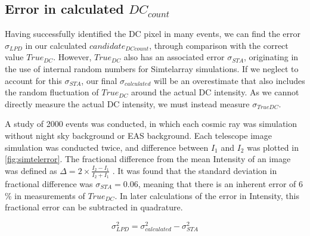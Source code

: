 \documentclass{article}
\begin{document}
\subsection{Error in calculated $DC_{count}$}
Having successfully identified the DC pixel in many events, we can find the error $\sigma_{LPD}$ in our calculated $candidate_{DC count}$, through comparison with the correct value $True_{DC}$. However, $True_{DC}$ also has an associated error $\sigma_{STA}$, originating in the use of internal random numbers for Sim\textunderscore telarray simulations. If we neglect to account for this $\sigma_{STA}$, our final $\sigma_{calculated}$ will be an overestimate that also includes the random fluctuation of $True_{DC}$ around the actual DC intensity. As we cannot directly measure the actual DC intensity, we must instead measure $\sigma_{TrueDC}$. 

A study of 2000 events was conducted, in which each cosmic ray was simulation without night sky background or EAS background. Each telescope image simulation was conducted twice, and difference between $I_{1}$ and $I_{2}$ was plotted in \ref{fig:simtelerror}. The fractional difference from the mean Intensity of an image was defined as $\Delta = 2 \times \frac{I_{2} - I_{1}}{{I_{2} + I_{1}}}$ . It was found that the standard deviation in fractional difference was $\sigma_{STA}=0.06$, meaning that there is an inherent error of 6 \% in measurements of $True_{DC}$. In later calculations of the error in Intensity, this fractional error can be subtracted in quadrature. 

\[ \sigma_{LPD}^{2} = \sigma_{calculated}^{2} - \sigma_{STA}^{2}  \]
\end{document}

